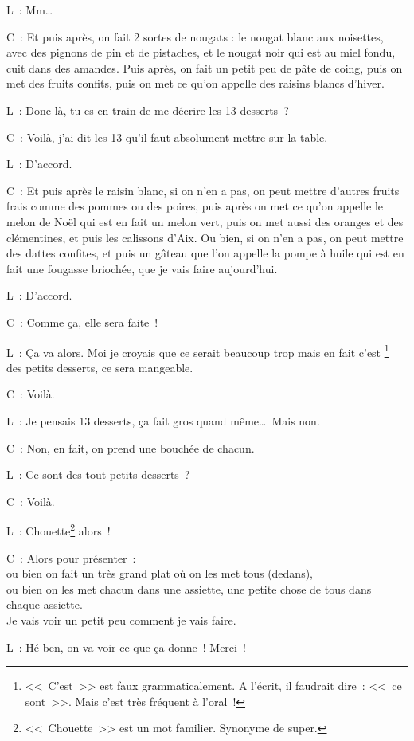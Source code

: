 \documentclass[11pt, french]{report}
\begin{document}
L~: Mm\ldots

C~: Et puis après, on fait 2 sortes de nougats : le nougat blanc aux noisettes,
avec des pignons de pin et de pistaches, et le nougat noir qui est au miel
fondu, cuit dans des amandes. Puis après, on fait un petit peu de pâte de
coing, puis on met des fruits confits, puis on met ce qu’on appelle des
raisins blancs d’hiver.

L~: Donc là, tu es en train de me décrire les 13 desserts~?

C~: Voilà, j’ai dit les 13 qu’il faut absolument mettre sur la table.

L~: D’accord.

C~: Et puis après le raisin blanc, si on n’en a pas, on peut mettre d’autres
fruits frais comme des pommes ou des poires, puis après on met ce qu’on
appelle le melon de Noël qui est en fait un melon vert, puis on met aussi des
oranges et des clémentines, et puis les calissons d’Aix. Ou bien, si on n’en
a pas, on peut mettre des dattes confites, et puis un gâteau que l’on appelle
la pompe à huile qui est en fait une fougasse briochée, que je vais faire
aujourd’hui.

L~: D’accord.

C~: Comme ça, elle sera faite~!

L~: Ça va alors. Moi je croyais que ce serait beaucoup trop mais en fait c’est
\footnote{<<~C'est~>> est faux grammaticalement. A l'écrit, il faudrait dire~:
  <<~ce sont~>>. Mais c'est très fréquent à l'oral~!} des petits desserts, ce
sera mangeable.

C~: Voilà.

L~: Je pensais 13 desserts, ça fait gros quand même\ldots\ Mais non.

C~: Non, en fait, on prend une bouchée de chacun.

L~: Ce sont des tout petits desserts~?

C~: Voilà.

L~: Chouette\footnote{<<~Chouette~>> est un mot familier. Synonyme de super.}
alors~!

C~: Alors pour présenter~:\\
ou bien on fait un très grand plat où on les met tous (dedans),\\
ou bien on les met chacun dans une assiette, une petite chose de tous dans
chaque assiette.\\
Je vais voir un petit peu comment je vais faire.

L~: Hé ben, on va voir ce que ça donne~! Merci~!
\end{document}
